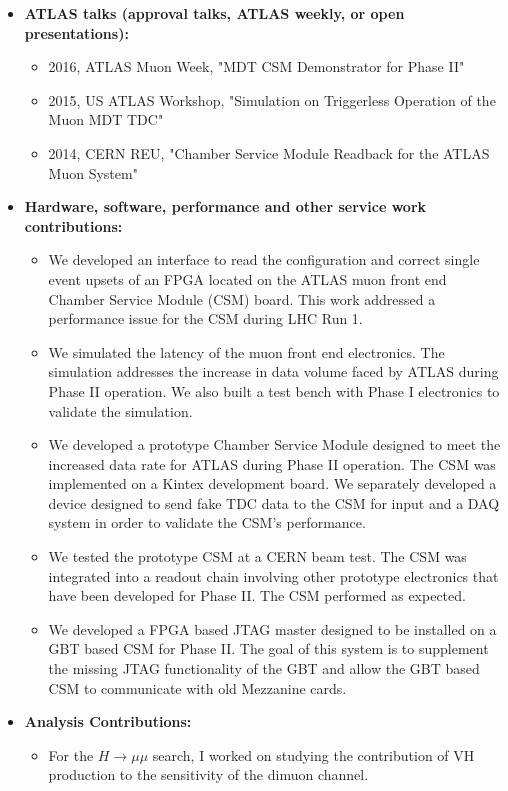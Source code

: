 \begin{itemize}
\item \textbf{ATLAS talks (approval talks, ATLAS weekly, or open presentations):}
  \begin{itemize}
    \item 2016, ATLAS Muon Week, "MDT CSM Demonstrator for Phase II"
    \item 2015, US ATLAS Workshop, "Simulation on Triggerless Operation of the Muon MDT TDC"
    \item 2014, CERN REU, "Chamber Service Module Readback for the ATLAS Muon System"
  \end{itemize}

\item \textbf{Hardware, software, performance and other service work contributions:}
  \begin{itemize}
  \item We developed an interface to read the configuration and correct single event upsets of an FPGA located on the ATLAS muon front end Chamber Service Module (CSM) board. This work addressed a performance issue for the CSM during LHC Run 1.
  \item We simulated the latency of the muon front end electronics. The simulation addresses the increase in data volume faced by ATLAS during Phase II operation. We also built a test bench with Phase I electronics to validate the simulation.
  \item We developed a prototype Chamber Service Module designed to meet the increased data rate for ATLAS during Phase II operation. The CSM was implemented on a Kintex development board. We separately developed a device designed to send fake TDC data to the CSM for input and a DAQ system in order to validate the CSM's performance.
  \item We tested the prototype CSM at a CERN beam test. The CSM was integrated into a readout chain involving other prototype electronics that have been developed for Phase II. The CSM performed as expected.
  \item We developed a FPGA based JTAG master designed to be installed on a GBT based CSM for Phase II. The goal of this system is to supplement the missing JTAG functionality of the GBT and allow the GBT based CSM to communicate with old Mezzanine cards.
  \end{itemize}

\item \textbf{Analysis Contributions:}
  \begin{itemize}
    \item For the $H\to\mu\mu$ search, I worked on studying the contribution of VH production to the sensitivity of the dimuon channel.
  \end{itemize}
\end{itemize}

